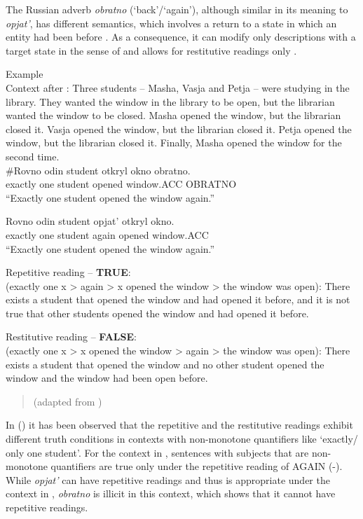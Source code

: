 \documentclass[output=paper,modfonts,nonflat,
 hidelinks
]{langsci/langscibook}
\begin{document}
The Russian adverb \textit{obratno} (‘back’/‘again’), although similar in its meaning to \textit{opjat’}, has different semantics, which involves a return to a state in which an entity had been before \citep{Tatevosov2016}. As a consequence, it can modify only descriptions with a target state in the sense of \citep{Kratzer2000} and allows for restitutive readings only .


 \ea\label{ex:bondarenko:}
{Example}\\

Context after \citep{LechnerEtAl2015}: Three students – Masha, Vasja and Petja – were studying in the library. They wanted the window in the library to be open, but the librarian wanted the window to be closed. Masha opened the window, but the librarian closed it. Vasja opened the window, but the librarian closed it. Petja opened the window, but the librarian closed it. Finally, Masha opened the window for the second time.\\


\ea
\gll \#Rovno odin student otkryl okno obratno.\\
     exactly one student opened window.ACC OBRATNO\\
\glt “Exactly one student opened the window again.”

\ex 
\gll Rovno odin student opjat’ otkryl okno.\\
     exactly one student again opened window.ACC\\
\glt “Exactly one student opened the window again.”

\ex Repetitive reading – \textbf{TRUE}:\\
\glt (exactly one x > again > x opened the window > the window was open): There exists a student that opened the window and had opened it before, and it is not true that other students opened the window and had opened it before.

\ex Restitutive reading – \textbf{FALSE}:\\
\glt (exactly one x > x opened the window > again > the window was open): There exists a student that opened the window and no other student opened the window and the window had been open before.
\z
\z

\begin{quote}
(adapted from \citep[31]{Tatevosov2016})
\end{quote}


In (\citealt{AlexiadouEtAl2014,LechnerEtAl2015}) it has been observed that the repetitive and the restitutive readings exhibit different truth conditions in contexts with non-monotone quantifiers like ‘exactly/ only one student’. For the context in , sentences with subjects that are non-monotone quantifiers are true only under the repetitive reading of AGAIN (-). While \textit{opjat’} can have repetitive readings and thus  is appropriate under the context in , \textit{obratno} is illicit in this context, which shows that it cannot have repetitive readings.
\end{document}
